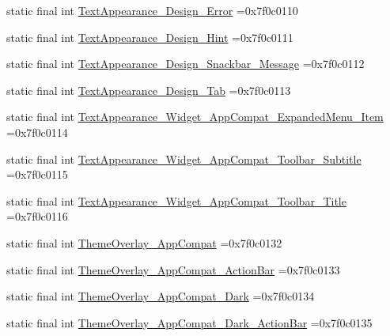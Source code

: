 \begin{DoxyCompactItemize}
\item 
static final int \mbox{\hyperlink{classbr_1_1unb_1_1cic_1_1mp_1_1marketmaster_1_1test_1_1R_1_1style_a38a2d18ac66d0a9df0bec796e6be3296}{Text\+Appearance\+\_\+\+Design\+\_\+\+Error}} =0x7f0c0110
\item 
static final int \mbox{\hyperlink{classbr_1_1unb_1_1cic_1_1mp_1_1marketmaster_1_1test_1_1R_1_1style_a4b638f4165634ebee40518b1019b78f9}{Text\+Appearance\+\_\+\+Design\+\_\+\+Hint}} =0x7f0c0111
\item 
static final int \mbox{\hyperlink{classbr_1_1unb_1_1cic_1_1mp_1_1marketmaster_1_1test_1_1R_1_1style_a5ef3b7337c8bbb19889f7a0726ab8811}{Text\+Appearance\+\_\+\+Design\+\_\+\+Snackbar\+\_\+\+Message}} =0x7f0c0112
\item 
static final int \mbox{\hyperlink{classbr_1_1unb_1_1cic_1_1mp_1_1marketmaster_1_1test_1_1R_1_1style_a02b1d16d02858a34791bad25f41cfd3d}{Text\+Appearance\+\_\+\+Design\+\_\+\+Tab}} =0x7f0c0113
\item 
static final int \mbox{\hyperlink{classbr_1_1unb_1_1cic_1_1mp_1_1marketmaster_1_1test_1_1R_1_1style_a8a4f37ca8871aefdcf3ee8993e5a4cef}{Text\+Appearance\+\_\+\+Widget\+\_\+\+App\+Compat\+\_\+\+Expanded\+Menu\+\_\+\+Item}} =0x7f0c0114
\item 
static final int \mbox{\hyperlink{classbr_1_1unb_1_1cic_1_1mp_1_1marketmaster_1_1test_1_1R_1_1style_a0719bcb12d10c419da1d7bb3f0b2cecb}{Text\+Appearance\+\_\+\+Widget\+\_\+\+App\+Compat\+\_\+\+Toolbar\+\_\+\+Subtitle}} =0x7f0c0115
\item 
static final int \mbox{\hyperlink{classbr_1_1unb_1_1cic_1_1mp_1_1marketmaster_1_1test_1_1R_1_1style_a512bf6d140f7adbeca61d123023c6a1d}{Text\+Appearance\+\_\+\+Widget\+\_\+\+App\+Compat\+\_\+\+Toolbar\+\_\+\+Title}} =0x7f0c0116
\item 
static final int \mbox{\hyperlink{classbr_1_1unb_1_1cic_1_1mp_1_1marketmaster_1_1test_1_1R_1_1style_a692fd320c2f8426a8ac2f3087edd79be}{Theme\+Overlay\+\_\+\+App\+Compat}} =0x7f0c0132
\item 
static final int \mbox{\hyperlink{classbr_1_1unb_1_1cic_1_1mp_1_1marketmaster_1_1test_1_1R_1_1style_aa9ec85059a4404aae9519f92be09f7cd}{Theme\+Overlay\+\_\+\+App\+Compat\+\_\+\+Action\+Bar}} =0x7f0c0133
\item 
static final int \mbox{\hyperlink{classbr_1_1unb_1_1cic_1_1mp_1_1marketmaster_1_1test_1_1R_1_1style_a74b6c24af7b4e407bddef80b39da6574}{Theme\+Overlay\+\_\+\+App\+Compat\+\_\+\+Dark}} =0x7f0c0134
\item 
static final int \mbox{\hyperlink{classbr_1_1unb_1_1cic_1_1mp_1_1marketmaster_1_1test_1_1R_1_1style_aa27f14098ee9d83548c6069787d98c6d}{Theme\+Overlay\+\_\+\+App\+Compat\+\_\+\+Dark\+\_\+\+Action\+Bar}} =0x7f0c0135

\end{DoxyCompactItemize}
